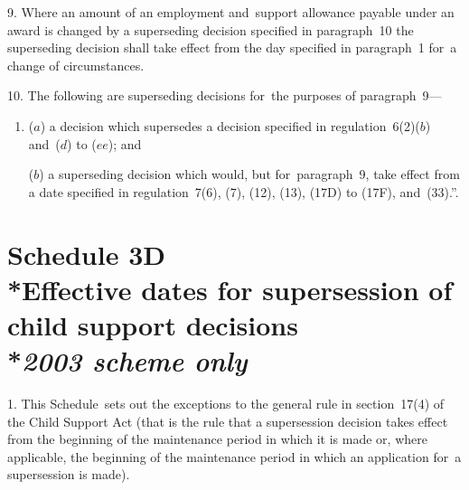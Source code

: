 \documentclass[12pt,a4paper]{article}
\begin{document}
\medskip

9.  Where an amount of an employment and~support allowance payable under an award is changed by a superseding decision specified in paragraph~10 the superseding decision shall take effect from the day specified in paragraph~1 for~a change of circumstances.

\medskip

10.  The following are superseding decisions for~the purposes of paragraph~9—
\begin{enumerate}\item[]
($a$) a decision which supersedes a decision specified in regulation~6(2)($b$)  and~($d$)  to ($ee$); and

\begin{sloppypar}
($b$) a superseding decision which would, but for~paragraph~9, take effect from a date specified in regulation~7(6), (7), (12), (13), (17D) to (17F), and~(33).”.
\end{sloppypar}
\end{enumerate}

\part[Schedule 3D --- Effective dates for supersession of child support decisions]{Schedule 3D\\*Effective dates for supersession of child support decisions\\*\emph{2003 scheme only}}

\renewcommand\parthead{--- Schedule 3D}


\medskip

1.  This Schedule~sets out the exceptions to the general rule in section~17(4) of the Child Support Act (that is the rule that a supersession decision takes effect from the beginning of the maintenance period in which it is made or, where applicable, the beginning of the maintenance period in which an application for~a supersession is made).
\end{document}
